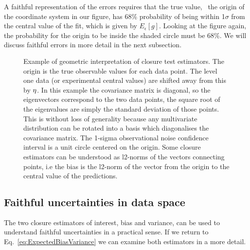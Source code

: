 A faithful representation of the errors requires that the true value, \ie\ the
origin of the coordinate system in our figure, has 68\% probability of being
within 1$\sigma$ from the central value of the fit, which is given by
$E_\epsilon[g]$. Looking at the figure again, the probability for the origin to
be inside the shaded circle must be 68\%. We will discuss faithful errors in
more detail in the next subsection.
%
\begin{figure}[h!]
    \centering
    \caption{Example of geometric interpretation of closure test estimators. The
    origin is the true observable values for each data point. The level one data
    (or experimental central values) are shifted away from this by $\eta$.
    In this example the covariance matrix is diagonal, so the eigenvectors
    correspond to the two data points, the square root of the eigenvalues are
    simply the standard deviation of those points. This is without loss of
    generality because any multivariate distribution can be rotated into a basis
    which diagonalises the covariance matrix. The 1-sigma observational noise
    confidence interval is a unit circle centered on the origin. Some closure
    estimators can be understood as l2-norms of the vectors connecting points,
    i.e the bias is the l2-norm of the vector from the origin to the central
    value of the predictions.}
    \label{fig:diagram2destimators}
\end{figure}
%

\subsection{Faithful uncertainties in data space}

The two closure estimators of interest, bias and variance, can be used to
understand faithful uncertainties in a practical sense. If we return to
Eq.~\ref{eq:ExpectedBiasVariance} we can examine both estimators in a more
detail.

